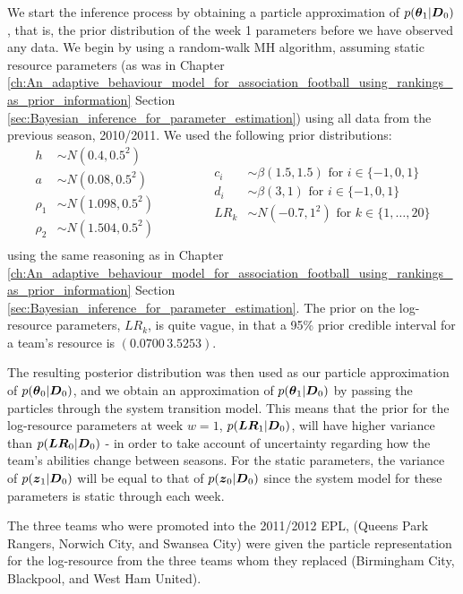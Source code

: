 We start the inference process by obtaining a particle approximation of \(p(\boldsymbol{\theta}_1 | \boldsymbol{D}_0)\), that is, the
prior distribution of the week 1 parameters before we have observed any data. We begin by using a random-walk \gls{MH}
algorithm, assuming static resource parameters (as was in Chapter
\ref{ch:An_adaptive_behaviour_model_for_association_football_using_rankings_as_prior_information} Section
\ref{sec:Bayesian_inference_for_parameter_estimation}) using all data from the previous season, 2010/2011. We used the
following prior distributions:
\begin{equation}
\begin{aligned}
h &\sim N(0.4, 0.5^2) \\
a &\sim N(0.08, 0.5^2) \\
\rho_1 &\sim N(1.098, 0.5^2) \\
\rho_2 &\sim N(1.504, 0.5^2) \\
\end{aligned}
\qquad\qquad
\begin{aligned}
c_i &\sim \beta(1.5, 1.5) \text{ for } i \in \{-1, 0, 1\} \\
d_i &\sim \beta(3, 1) \text{ for } i \in \{-1, 0, 1\} \\
LR_k &\sim N(-0.7, 1^2) \text{ for } k \in \{1,\ldots, 20\}
\end{aligned}
\end{equation}
using the same reasoning as in Chapter
\ref{ch:An_adaptive_behaviour_model_for_association_football_using_rankings_as_prior_information} Section
\ref{sec:Bayesian_inference_for_parameter_estimation}. The prior on the log-resource parameters, \(LR_k\), is quite
vague, in that a 95\% prior credible interval for a team's resource is \((0.0700\, 3.5253)\).

The resulting posterior distribution was then used as our particle approximation of \(p(\boldsymbol{\theta}_0 | \boldsymbol{D}_0)\), and
we obtain an approximation of \(p(\boldsymbol{\theta}_1 | \boldsymbol{D}_0)\) by passing the particles through the system transition
model. This means that the prior for the log-resource parameters at week \(w = 1\), \(p(\boldsymbol{LR}_1 | \boldsymbol{D}_0)\), will
have higher variance than \(p(\boldsymbol{LR}_0 | \boldsymbol{D}_0)\) - in order to take account of uncertainty regarding how the team's
abilities change between seasons. For the static parameters, the variance of \(p(\boldsymbol{z}_1 | \boldsymbol{D}_0)\) will be equal to
that of \(p(\boldsymbol{z}_0 | \boldsymbol{D}_0)\) since the system model for these parameters is static through each week.

The three teams who were promoted into the 2011/2012 \gls{EPL}, (Queens Park Rangers, Norwich City, and Swansea City)
were given the particle representation for the log-resource from the three teams whom they replaced (Birmingham City,
Blackpool, and West Ham United).

